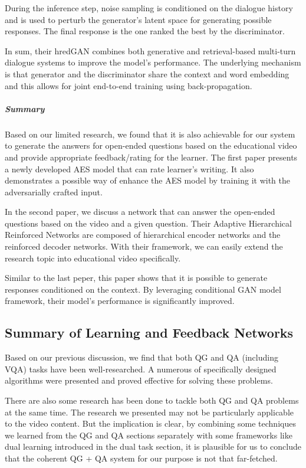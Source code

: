 \documentclass[]{book}
\let\oldsubparagraph\subparagraph
\renewcommand{\subparagraph}[1]{\oldsubparagraph{#1}\mbox{}}
\theoremstyle{definition}
\theoremstyle{definition}
\theoremstyle{definition}
\theoremstyle{remark}
\begin{document}
During the inference step, noise sampling is conditioned on the dialogue
history and is used to perturb the generator's latent space for
generating possible responses. The final response is the one ranked the
best by the discriminator.

In sum, their hredGAN combines both generative and retrieval-based
multi-turn dialogue systems to improve the model's performance. The
underlying mechanism is that generator and the discriminator share the
context and word embedding and this allows for joint end-to-end training
using back-propagation.

\subparagraph{Summary}\label{summary-3}

Based on our limited research, we found that it is also achievable for
our system to generate the answers for open-ended questions based on the
educational video and provide appropriate feedback/rating for the
learner. The first paper presents a newly developed AES model that can
rate learner's writing. It also demonstrates a possible way of enhance
the AES model by training it with the adversarially crafted input.

In the second paper, we discuss a network that can answer the open-ended
questions based on the video and a given question. Their Adaptive
Hierarchical Reinforced Networks are composed of hierarchical encoder
networks and the reinforced decoder networks. With their framework, we
can easily extend the research topic into educational video
specifically.

Similar to the last peper, this paper shows that it is possible to
generate responses conditioned on the context. By leveraging conditional
GAN model framework, their model's performance is significantly
improved.

\subsection{Summary of Learning and Feedback
Networks}\label{summary-of-learning-and-feedback-networks}

Based on our previous discussion, we find that both QG and QA (including
VQA) tasks have been well-researched. A numerous of specifically
designed algorithms were presented and proved effective for solving
these problems.

There are also some research has been done to tackle both QG and QA
problems at the same time. The research we presented may not be
particularly applicable to the video content. But the implication is
clear, by combining some techniques we learned from the QG and QA
sections separately with some frameworks like dual learning introduced
in the dual task section, it is plausible for us to conclude that the
coherent QG + QA system for our purpose is not that far-fetched.
\end{document}
